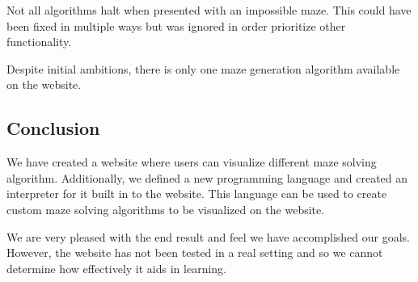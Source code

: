 Not all algorithms halt when presented with an impossible maze. This could have been fixed in multiple ways but was ignored in order prioritize other functionality.

Despite initial ambitions, there is only one maze generation algorithm available on the website.

\subsection{Conclusion}

We have created a website where users can visualize different maze solving algorithm. Additionally, we defined a new programming language and created an interpreter for it built in to the website. This language can be used to create custom maze solving algorithms to be visualized on the website.

We are very pleased with the end result and feel we have accomplished our goals. However, the website has not been tested in a real setting and so we cannot determine how effectively it aids in learning.
